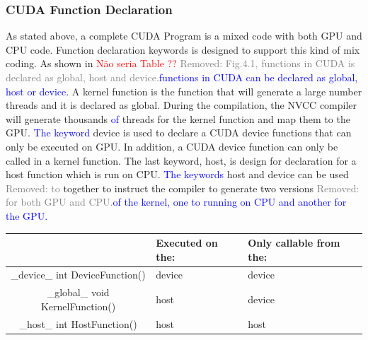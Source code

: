 \documentclass[Ingles]{ic-tese-v1}
\newcommand{\marcio}[1]{\textcolor{red}{ {#1}}}
\newcommand{\rem}[1]{\noindent\textcolor{gray}{Removed: {#1}}}
\newcommand{\new}[1]{\noindent\textcolor{blue}{ {#1}}}
\newcommand{\marcio}[1]{}
\newcommand{\rem}[1]{}
\newcommand{\new}[1]{#1}
\begin{document}
\subsubsection{CUDA Function Declaration}
\label{CUDAfunction}

As stated above, a complete CUDA Program is a mixed code with both GPU and CPU
code. Function declaration keywords is designed to support this kind of mix coding. As
shown in \marcio{Não seria Table ??} \rem{Fig.4.1, functions in CUDA is declared as global, host and device.}\new{functions in CUDA can be declared as global, host or device.} A kernel
function is the function that will generate a large number threads and it is declared as
global. During the compilation, the NVCC compiler will generate thousands \new{of} threads for
the kernel function and map them to the GPU. \new{The keyword} device is used to declare a CUDA device
functions that can only be executed on GPU. In addition, a CUDA device function can
only be called in a kernel function. The last keyword, host, is design for declaration for a
host function which is run on CPU. \new{The keywords} host and device can be used \rem{to} together to instruct
the compiler to generate two versions \rem{for both GPU and CPU.}\new{of the kernel, one to running on CPU and another for the GPU.}


\begin{center}
	\begin{tabular}{ | c | >{\centering\arraybackslash}p{2cm} | >{\centering\arraybackslash}p{3cm} |}
		\hline
		 & Executed on the: & Only callable from the: \\ \hline
		{\color{blue} \_device\_} int DeviceFunction() & device & device \\ \hline
		{\color{blue} \_global\_} void KernelFunction()& host & device \\ \hline
		{\color{blue} \_host\_} int HostFunction() & host & host\\
		\hline
	\end{tabular}
\end{center}
\end{document}
